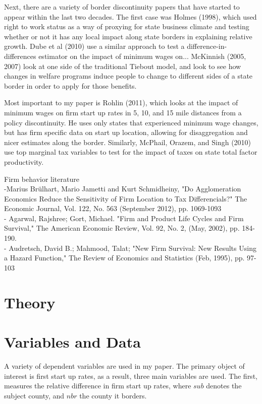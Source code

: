 \documentclass[11pt,a4paper]{article}\usepackage[]{graphicx}\usepackage[]{color}
\begin{document}
Next, there are a variety of border discontinuity papers that have started to appear within the last two decades. The first case was Holmes (1998), which used right to work status as a way of proxying for state business climate and testing whether or not it has any local impact along state borders in explaining relative growth. Dube et al (2010) use a similar approach to test a difference-in-differences estimator on the impact of minimum wages on... McKinnish (2005, 2007) look at one side of the traditional Tiebout model, and look to see how changes in welfare programs induce people to change to different sides of a state border in order to apply for those benefits.

Most important to my paper is Rohlin (2011), which looks at the impact of minimum wages on firm start up rates in 5, 10, and 15 mile distances from a policy discontinuity. He uses only states that experienced minimum wage changes, but has firm specific data on start up location, allowing for disaggregation and nicer estimates along the border. Similarly, McPhail, Orazem, and Singh (2010) use top marginal tax variables to test for the impact of taxes on state total factor productivity.


Firm behavior literature \\
-Marius Brülhart, Mario Jametti and Kurt Schmidheiny, "Do Agglomeration Economics Reduce the Sensitivity of Firm Location to Tax Differencials?" The Economic Journal, Vol. 122, No. 563 (September 2012), pp. 1069-1093 \\
- Agarwal, Rajshree; Gort, Michael. "Firm and Product Life Cycles and Firm Survival," The American Economic Review, Vol. 92, No. 2, (May, 2002), pp. 184-190. \\
- Audretsch, David B.; Mahmood, Talat; "New Firm Survival: New Results Using a Hazard Function," The Review of Economics and Statistics (Feb, 1995), pp. 97-103 \\

\section{Theory}


\section{Variables and Data}

A variety of dependent variables are used in my paper. The primary object of interest is first start up rates, as a result, three main variables are used. The first, measures the relative difference in firm start up rates, where $sub$ denotes the subject county, and $nbr$ the county it borders.
\end{document}
